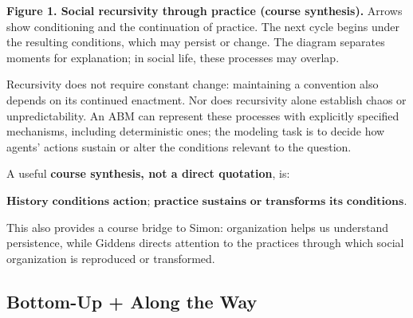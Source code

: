 \documentclass[11pt,a4paper]{article}
\newenvironment{fitdisplay}{\par\medskip\noindent\begin{lrbox}{\displaybox}$\displaystyle}{%
$\end{lrbox}\makebox[\linewidth][c]{\ifdim\wd\displaybox>\linewidth\resizebox{\linewidth}{!}{\usebox{\displaybox}}\else\usebox{\displaybox}\fi}\par\medskip}
\begin{document}
\begin{center}
\end{center}
{\small\textbf{Figure 1. Social recursivity through practice (course synthesis).} Arrows show conditioning and the continuation of practice. The next cycle begins under the resulting conditions, which may persist or change. The diagram separates moments for explanation; in social life, these processes may overlap.}

Recursivity does not require constant change: maintaining a convention also depends on its continued enactment. Nor does recursivity alone establish chaos or unpredictability. An ABM can represent these processes with explicitly specified mechanisms, including deterministic ones; the modeling task is to decide how agents' actions sustain or alter the conditions relevant to the question.

A useful \textbf{course synthesis, not a direct quotation}, is:
\begin{fitdisplay}
\boxed{\textbf{History conditions action; practice sustains or transforms its conditions.}}
\end{fitdisplay}

This also provides a course bridge to Simon: organization helps us understand persistence, while Giddens directs attention to the practices through which social organization is reproduced or transformed.

\subsection{Bottom-Up + Along the Way}
\end{document}
